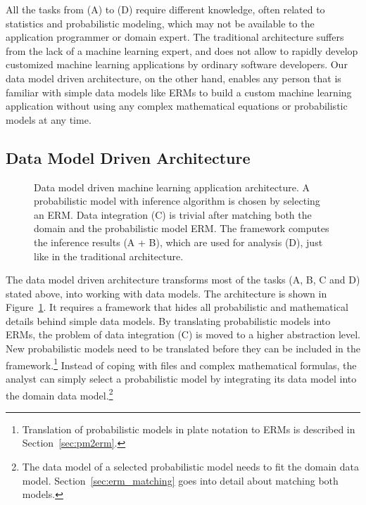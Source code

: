 All the tasks from (A) to (D) require different knowledge, often related to statistics and probabilistic modeling, which may not be available to the application programmer or domain expert. The traditional architecture suffers from the lack of a machine learning expert, and does not allow to rapidly develop customized machine learning applications by ordinary software developers. Our data model driven architecture, on the other hand, enables any person that is familiar with simple data models like ERMs to build a custom machine learning application without using any complex mathematical equations or probabilistic models at any time.

\newpage %

\subsection{Data Model Driven Architecture}

\begin{figure}
\centering
\scalebox{\tikzScale}{\adjustTikzSize }
\caption[Data model driven machine learning application architecture]{Data model driven machine learning application architecture. A probabilistic model with inference algorithm is chosen by selecting an ERM. Data integration (C) is trivial after matching both the domain and the probabilistic model ERM. The framework computes the inference results (A + B), which are used for analysis (D), just like in the traditional architecture.}\label{fig:ml-application-architecture-dm}
\end{figure}

The data model driven architecture transforms most of the tasks (A, B, C and D) stated above, into working with data models. The architecture is shown in Figure~\ref{fig:ml-application-architecture-dm}. It requires a framework that hides all probabilistic and mathematical details behind simple data models. By translating probabilistic models into ERMs, the problem of data integration (C) is moved to a higher abstraction level. New probabilistic models need to be translated before they can be included in the framework.\footnote{Translation of probabilistic models in plate notation to ERMs is described in Section~\ref{sec:pm2erm}.} Instead of coping with files and complex mathematical formulas, the analyst can simply select a probabilistic model by integrating its data model into the domain data model.\footnote{The data model of a selected probabilistic model needs to fit the domain data model. Section~\ref{sec:erm_matching} goes into detail about matching both models.}

